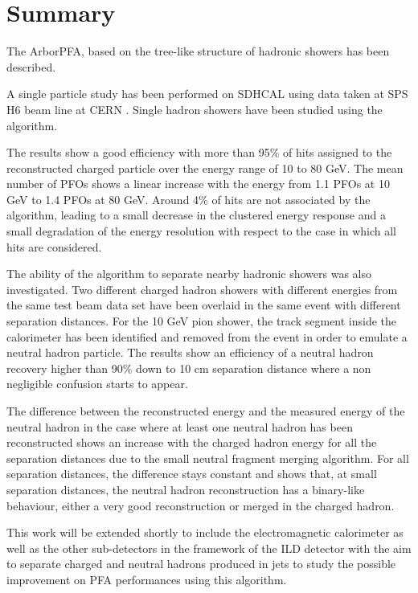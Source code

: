 \documentclass[cits]{JINST}
\begin{document}
\section{Summary}

The ArborPFA, based on the tree-like structure of hadronic showers has been described. 

A single particle study has been performed on SDHCAL using data taken at SPS H6 beam line at CERN \cite{sdhcal-paper}. Single hadron showers have been studied using the algorithm.

The results show a good efficiency with more than 95\% of hits assigned to the reconstructed charged particle over the energy range of 10 to 80 GeV. The mean number of PFOs shows a linear increase with the energy from 1.1 PFOs at 10 GeV to 1.4 PFOs at 80 GeV. Around 4\% of hits are not associated by the algorithm, leading to a small decrease in the clustered energy response and a small degradation of the energy resolution with respect to the case in which all hits are considered.

The ability of the algorithm to separate nearby hadronic showers was also investigated. Two different charged hadron showers with different energies from the same test beam data set have been overlaid in the same event with different separation distances. For the 10 GeV pion shower, the track segment inside the calorimeter has been identified and removed from the event in order to emulate a neutral hadron particle. The results show an efficiency of a neutral hadron recovery higher than 90\% down to 10 cm separation distance where a non negligible confusion starts to appear. 

The difference between the reconstructed energy and the measured energy of the neutral hadron in the case where at least one neutral hadron has been reconstructed shows an increase with the charged hadron energy for all the separation distances due to the small neutral fragment merging algorithm. For all separation distances, the difference stays constant and shows that, at small separation distances, the neutral hadron reconstruction has a binary-like behaviour, either a very good reconstruction or merged in the charged hadron.

This work will be extended shortly to include the electromagnetic calorimeter as well as the other sub-detectors in the framework of the ILD detector with the aim to separate charged and neutral hadrons produced in jets to study the possible improvement on PFA performances using this algorithm.
\end{document}
